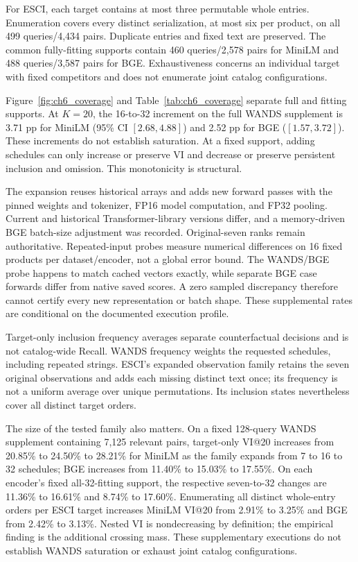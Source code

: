 For ESCI, each target contains at most three permutable whole entries. Enumeration covers every distinct serialization, at most six per product, on all 499 queries/4,434 pairs. Duplicate entries and fixed text are preserved. The common fully-fitting supports contain 460 queries/2,578 pairs for MiniLM and 488 queries/3,587 pairs for BGE. Exhaustiveness concerns an individual target with fixed competitors and does not enumerate joint catalog configurations.

Figure~\ref{fig:ch6_coverage} and Table~\ref{tab:ch6_coverage} separate full and fitting supports. At $K=20$, the 16-to-32 increment on the full WANDS supplement is 3.71 pp for MiniLM (95\% CI $[2.68,4.88]$) and 2.52 pp for BGE ($[1.57,3.72]$). These increments do not establish saturation. At a fixed support, adding schedules can only increase or preserve VI and decrease or preserve persistent inclusion and omission. This monotonicity is structural.

The expansion reuses historical arrays and adds new forward passes with the pinned weights and tokenizer, FP16 model computation, and FP32 pooling. Current and historical Transformer-library versions differ, and a memory-driven BGE batch-size adjustment was recorded. Original-seven ranks remain authoritative. Repeated-input probes measure numerical differences on 16 fixed products per dataset/encoder, not a global error bound. The WANDS/BGE probe happens to match cached vectors exactly, while separate BGE case forwards differ from native saved scores. A zero sampled discrepancy therefore cannot certify every new representation or batch shape. These supplemental rates are conditional on the documented execution profile.

Target-only inclusion frequency averages separate counterfactual decisions and is not catalog-wide Recall. WANDS frequency weights the requested schedules, including repeated strings. ESCI's expanded observation family retains the seven original observations and adds each missing distinct text once; its frequency is not a uniform average over unique permutations. Its inclusion states nevertheless cover all distinct target orders.

The size of the tested family also matters. On a fixed 128-query WANDS supplement containing 7,125 relevant pairs, target-only VI@20 increases from 20.85\% to 24.50\% to 28.21\% for MiniLM as the family expands from 7 to 16 to 32 schedules; BGE increases from 11.40\% to 15.03\% to 17.55\%. On each encoder's fixed all-32-fitting support, the respective seven-to-32 changes are 11.36\% to 16.61\% and 8.74\% to 17.60\%. Enumerating all distinct whole-entry orders per ESCI target increases MiniLM VI@20 from 2.91\% to 3.25\% and BGE from 2.42\% to 3.13\%. Nested VI is nondecreasing by definition; the empirical finding is the additional crossing mass. These supplementary executions do not establish WANDS saturation or exhaust joint catalog configurations.

